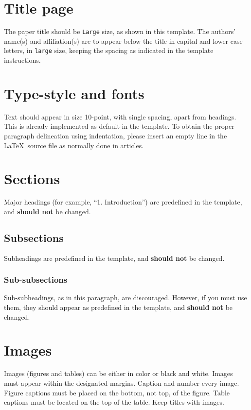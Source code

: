 \documentclass[10pt,a4paper,twocolumn]{article}
\begin{document}
\section{Title page}
\label{sec:title-page}
The paper title should be \texttt{Large} size, as shown in this template.
The authors' name(s) and affiliation(s) are to appear below the title in capital and lower case letters, in \texttt{large} size, keeping the spacing as indicated in the template instructions.



\section{Type-style and fonts}
\label{sec:fonts}
Text should appear in size 10-point, with single spacing, apart from headings.
This is already implemented as default in the template.
To obtain the proper paragraph delineation using indentation, please insert an empty line in the \LaTeX\ source file as normally done in articles.


\section{Sections}
\label{sec:sections}
Major headings (for example, ``1. Introduction'') are predefined in the template, and \textbf{should not} be changed.

\subsection{Subsections}
\label{ssec:subsection}
Subheadings are predefined in the template, and \textbf{should not} be changed.

\subsubsection{Sub-subsections}
\label{sssec:subsubsection}
Sub-subheadings, as in this paragraph, are discouraged.
However, if you must use them, they should appear as predefined in the template, and \textbf{should not} be changed.


\section{Images}
\label{sec:images}
Images (figures and tables) can be either in color or black and white.
Images must appear within the designated margins.
Caption and number every image.
Figure captions must be placed on the bottom, not top, of the figure.
Table captions must be located on the top of the table.
Keep titles with images. 
\end{document}
